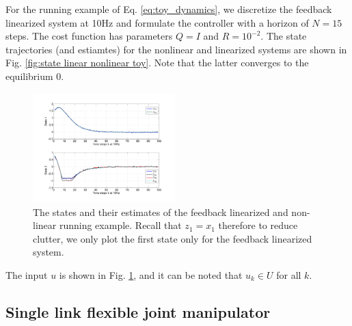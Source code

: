 For the running example of Eq. \ref{eq:toy_dynamics}, we discretize the feedback linearized system at 10Hz and formulate the controller with a horizon of $N=15$ steps. 
The cost function has parameters $Q=I$ and $R=10^{-2}$.
The state trajectories (and estiamtes) for the nonlinear and linearized systems are shown in Fig. \ref{fig:state linear nonlinear toy}.
Note that the latter converges to the equilibrium 0. 

\begin{figure}
	\centering	
	\includegraphics[width=0.49\textwidth]{figs/AllStates_toy.pdf}
	\caption{The states and their estimates of the feedback linearized and non-linear running example. Recall that $z_1 = x_1$ therefore to reduce clutter, we only plot the first state only for the feedback linearized system.}
	\label{fig:input toy}
\end{figure}





The input $u$ is shown in Fig. \ref{fig:input toy}, and it can be noted that $u_k \in U$ for all $k$.

\subsection{Single link flexible joint manipulator}
\label{sec:manipulator}

